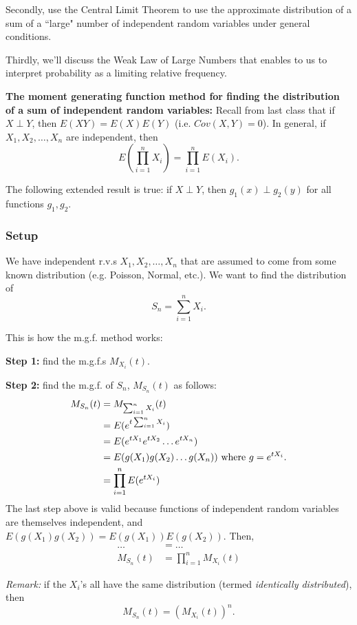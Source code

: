 \documentclass[12pt]{article}
\begin{document}
Secondly, use the Central Limit Theorem to use the approximate distribution of a sum of a ``large" number of independent random variables under general conditions.

Thirdly, we'll discuss the Weak Law of Large Numbers that enables to us to interpret probability as a limiting relative frequency. 

\textbf{The moment generating function method for finding the distribution of a sum of independent random variables:} Recall from last class that if $X \perp Y$, then $E(XY) = E(X)E(Y)$ (i.e. $Cov(X,Y) = 0$). In general, if $X_1, X_2, \dots, X_n$ are independent, then
\[
    E(\prod_{i = 1}^n X_i) = \prod_{i = 1}^n E(X_i).
\]

The following extended result is true: if $X \perp Y$, then $g_1 (x) \perp g_2 (y)$ for all functions $g_1, g_2$.

\subsubsection{Setup}
We have independent r.v.s $X_1, X_2, \dots, X_n$ that are assumed to come from some known distribution (e.g. Poisson, Normal, etc.). We want to find the distribution of
\[
    S_n = \sum_{i = 1}^n X_i.
\]

This is how the m.g.f. method works:

\textbf{Step 1:} find the m.g.f.s $M_{X_i} (t)$.

\textbf{Step 2:} find the m.g.f. of $S_n$, $M_{S_n} (t)$ as follows:
\begin{align*}
    M_{S_n} (t) &= M_{\sum_{i = 1}^n X_i} (t) \\
        &= E(e^{t \sum_{i = 1}^n X_i}) \\
        &= E(e^{t X_1} e^{t X_2} \dots e^{t X_n}) \\
        &= E(g(X_1) g(X_2) \dots g(X_n)) \textnormal{ where $g = e^{t X_i}$.} \\
        &= \prod_{i = 1}^n E(e^{t X_i}) 
\end{align*}
The last step above is valid because functions of independent random variables are themselves independent, and $E(g(X_1) g(X_2)) = E(g(X_1)) E(g(X_2))$. Then,
\begin{align*}
    \dots &= \dots \\
    M_{S_n} (t) &= \prod_{i = 1}^n M_{X_i} (t)
\end{align*}

\emph{Remark:} if the $X_i$'s all have the same distribution (termed \emph{identically distributed}), then
\[
    M_{S_n} (t) = (M_{X_i} (t))^n.
\]
\end{document}
